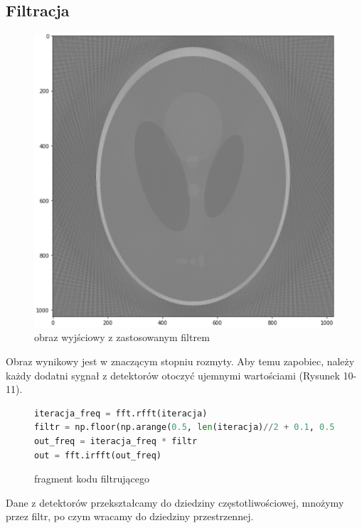 \documentclass[polish,polish,a4paper]{article}
\begin{document}
				\subsection{Filtracja}
					\begin{figure}[!h]
						\centering
						\includegraphics[scale=0.35]{img/out_180_filtered.png}
						\caption{obraz wyjściowy z zastosowanym filtrem}
					\end{figure}
					Obraz wynikowy jest w znaczącym stopniu rozmyty.
					Aby temu zapobiec, należy każdy dodatni sygnał z detektorów otoczyć ujemnymi wartościami (Rysunek 10-11).
					\begin{figure}[!h]
					\centering
						\begin{lstlisting}[language=Python, frame=single]
iteracja_freq = fft.rfft(iteracja)
filtr = np.floor(np.arange(0.5, len(iteracja)//2 + 0.1, 0.5 ))
out_freq = iteracja_freq * filtr
out = fft.irfft(out_freq)
						\end{lstlisting}
						\caption{fragment kodu filtrującego}
				\end{figure}
					
					Dane z detektorów przekształcamy do dziedziny częstotliwościowej,
					 mnożymy przez filtr, 
					 po czym wracamy do dziedziny przestrzennej.
					
\end{document}

